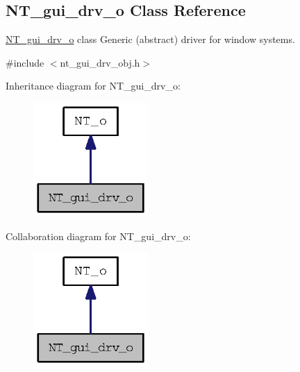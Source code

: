 \subsection{NT\_\-gui\_\-drv\_\-o Class Reference}
\label{class_n_t__gui__drv__o}


\hyperlink{class_n_t__gui__drv__o}{NT\_\-gui\_\-drv\_\-o} class Generic (abstract) driver for window systems.  




{\ttfamily \#include $<$nt\_\-gui\_\-drv\_\-obj.h$>$}



Inheritance diagram for NT\_\-gui\_\-drv\_\-o:
\nopagebreak
\begin{figure}[H]
\begin{center}
\leavevmode
\includegraphics[width=124pt]{class_n_t__gui__drv__o__inherit__graph}
\end{center}
\end{figure}


Collaboration diagram for NT\_\-gui\_\-drv\_\-o:
\nopagebreak
\begin{figure}[H]
\begin{center}
\leavevmode
\includegraphics[width=124pt]{class_n_t__gui__drv__o__coll__graph}
\end{center}
\end{figure}
